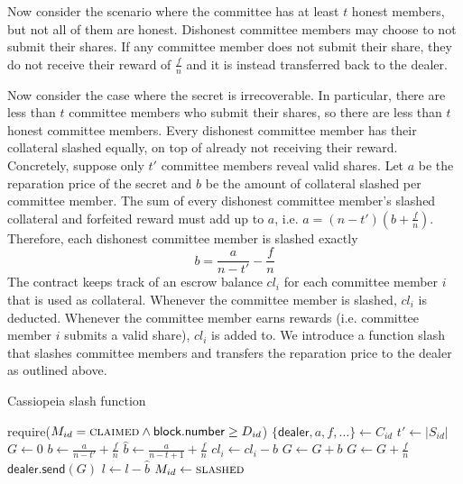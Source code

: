 Now consider the scenario where the committee has at least $t$ honest members, but not all of them are honest.
Dishonest committee members may choose to not submit their shares.
If any committee member does not submit their share, they do not receive their reward of $\frac{f}{n}$ and it is instead transferred back to the dealer.

Now consider the case where the secret is irrecoverable.
In particular, there are less than $t$ committee members who submit their shares, so there are less than $t$ honest committee members.
Every dishonest committee member has their collateral slashed equally, on top of already not receiving their reward.
Concretely, suppose only $t'$ committee members reveal valid shares.
Let $a$ be the reparation price of the secret and $b$ be the amount of collateral slashed per committee member.
The sum of every dishonest committee member's slashed collateral and forfeited reward must add up to $a$, i.e. $a = (n - t')(b + \frac{f}{n})$.
Therefore, each dishonest committee member is slashed exactly
\begin{equation}\label{eq:slash_amount}
    b = \frac{a}{n - t'} - \frac{f}{n}
\end{equation}
The contract keeps track of an escrow balance $cl_i$ for each committee member $i$ that is used as collateral.
Whenever the committee member is slashed, $cl_i$ is deducted.
Whenever the committee member earns rewards (i.e. committee member $i$ submits a valid share), $cl_i$ is added to.
We introduce a function \textsf{slash} that slashes committee members and transfers the reparation price to the dealer as outlined above.

\begin{algorithm}[H]
\caption{Cassiopeia \textsf{slash} function}
    \begin{algorithmic}[1]
                \State require($M_{id} = \textsc{claimed} \land \textsf{block.number} \geq D_{id}$)
                \State $\{\textsf{dealer}, a, f, \dots\} \gets C_{id}$
                \State $t' \gets |S_{id}|$
                \State $G \gets 0$
                \State $b \gets \frac{a}{n - t'} + \frac{f}{n}$ 
                \State $\hat{b} \gets \frac{a}{n - t + 1} + \frac{f}{n}$ 
                            \State $cl_i \gets cl_i - b$
                            \State $G \gets G + b$
                        \EndIf
                        \State $G \gets G + \frac{f}{n}$
                    \EndIf
                \EndFor
                \State $\textsf{dealer.send}(G)$
                \State $l \gets l - \hat{b}$ 
                \State $M_{id} \gets \textsc{slashed}$
            \EndFunction
    \end{algorithmic}
\end{algorithm}

